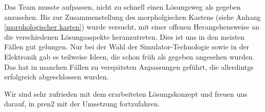 \documentclass[../main.tex]{subfiles}
\begin{document}
Das Team musste aufpassen, nicht zu schnell einen Lösungsweg als gegeben anzusehen. Bis zur Zusammenstellung des morpholgischen Kastens (siehe Anhang \ref{morphologischer kasten}) wurde versucht, mit einer offenen Herangehensweise an die verschiedenen Lösungsaspekte heranzutreten. Dies ist uns in den meisten Fällen gut gelungen. Nur bei der Wahl der Simulator-Technologie sowie in der Elektronik gab es teilweise Ideen, die schon früh als gegeben angesehen wurden. Das hat in manchen Fällen zu verspäteten Anpassungen geführt, die allerdintgs erfolgreich abgeschlossen wurden.

Wir sind sehr zufrieden mit dem erarbeiteten Lösungskonzept und freuen uns darauf, in \acrshort{pren2} mit der Umsetzung fortzufahren.
\end{document}

